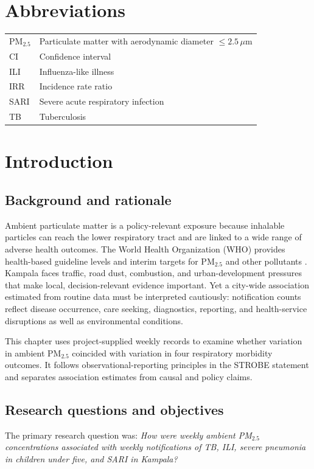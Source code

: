 \documentclass[12pt,a4paper]{report}
\newcommand{\pmfive}{PM$_{2.5}$}
\begin{document}
\chapter*{Abbreviations}
\begin{tabular}{ll}
\pmfive{} & Particulate matter with aerodynamic diameter $\leq 2.5\,\mu$m \\
CI & Confidence interval \\
ILI & Influenza-like illness \\
IRR & Incidence rate ratio \\
SARI & Severe acute respiratory infection \\
TB & Tuberculosis \\
\end{tabular}

\tableofcontents
\clearpage
{}

\chapter{Introduction}
\section{Background and rationale}
Ambient particulate matter is a policy-relevant exposure because inhalable particles can reach the lower respiratory tract and are linked to a wide range of adverse health outcomes. The World Health Organization (WHO) provides health-based guideline levels and interim targets for \pmfive{} and other pollutants \parencite{WHO2021}. Kampala faces traffic, road dust, combustion, and urban-development pressures that make local, decision-relevant evidence important. Yet a city-wide association estimated from routine data must be interpreted cautiously: notification counts reflect disease occurrence, care seeking, diagnostics, reporting, and health-service disruptions as well as environmental conditions.

This chapter uses project-supplied weekly records to examine whether variation in ambient \pmfive{} coincided with variation in four respiratory morbidity outcomes. It follows observational-reporting principles in the STROBE statement \parencite{vonElm2007} and separates association estimates from causal and policy claims.

\section{Research questions and objectives}
The primary research question was: \emph{How were weekly ambient \pmfive{} concentrations associated with weekly notifications of TB, ILI, severe pneumonia in children under five, and SARI in Kampala?}
\end{document}
